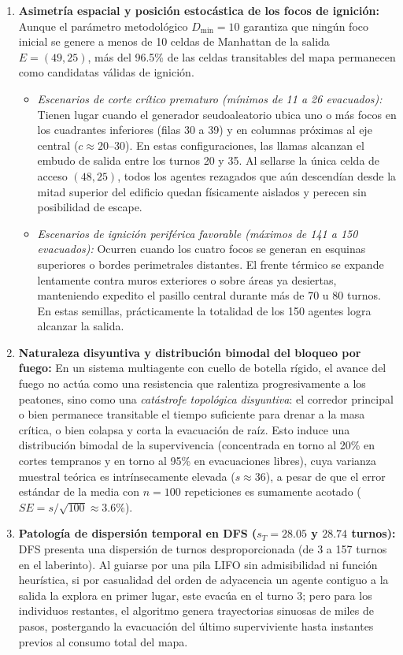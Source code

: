 \documentclass[11pt,letterpaper]{article}
\begin{document}
\begin{enumerate}
    \item \textbf{Asimetría espacial y posición estocástica de los focos de ignición:} Aunque el parámetro metodológico $D_{\min}=10$ garantiza que ningún foco inicial se genere a menos de 10 celdas de Manhattan de la salida $E=(49,25)$, más del 96.5\% de las celdas transitables del mapa permanecen como candidatas válidas de ignición.
    \begin{itemize}
        \item \textit{Escenarios de corte crítico prematuro (mínimos de 11 a 26 evacuados):} Tienen lugar cuando el generador seudoaleatorio ubica uno o más focos en los cuadrantes inferiores (filas 30 a 39) y en columnas próximas al eje central ($c \approx 20$--$30$). En estas configuraciones, las llamas alcanzan el embudo de salida entre los turnos 20 y 35. Al sellarse la única celda de acceso $(48,25)$, todos los agentes rezagados que aún descendían desde la mitad superior del edificio quedan físicamente aislados y perecen sin posibilidad de escape.
        \item \textit{Escenarios de ignición periférica favorable (máximos de 141 a 150 evacuados):} Ocurren cuando los cuatro focos se generan en esquinas superiores o bordes perimetrales distantes. El frente térmico se expande lentamente contra muros exteriores o sobre áreas ya desiertas, manteniendo expedito el pasillo central durante más de 70 u 80 turnos. En estas semillas, prácticamente la totalidad de los 150 agentes logra alcanzar la salida.
    \end{itemize}

    \item \textbf{Naturaleza disyuntiva y distribución bimodal del bloqueo por fuego:} En un sistema multiagente con cuello de botella rígido, el avance del fuego no actúa como una resistencia que ralentiza progresivamente a los peatones, sino como una \textit{catástrofe topológica disyuntiva}: el corredor principal o bien permanece transitable el tiempo suficiente para drenar a la masa crítica, o bien colapsa y corta la evacuación de raíz. Esto induce una distribución bimodal de la supervivencia (concentrada en torno al 20\% en cortes tempranos y en torno al 95\% en evacuaciones libres), cuya varianza muestral teórica es intrínsecamente elevada ($s \approx 36$), a pesar de que el error estándar de la media con $n=100$ repeticiones es sumamente acotado ($SE = s / \sqrt{100} \approx 3.6\%$).

    \item \textbf{Patología de dispersión temporal en DFS ($s_T = 28.05$ y $28.74$ turnos):} DFS presenta una dispersión de turnos desproporcionada (de 3 a 157 turnos en el laberinto). Al guiarse por una pila LIFO sin admisibilidad ni función heurística, si por casualidad del orden de adyacencia un agente contiguo a la salida la explora en primer lugar, este evacúa en el turno 3; pero para los individuos restantes, el algoritmo genera trayectorias sinuosas de miles de pasos, postergando la evacuación del último superviviente hasta instantes previos al consumo total del mapa.
\end{enumerate}
\end{document}
